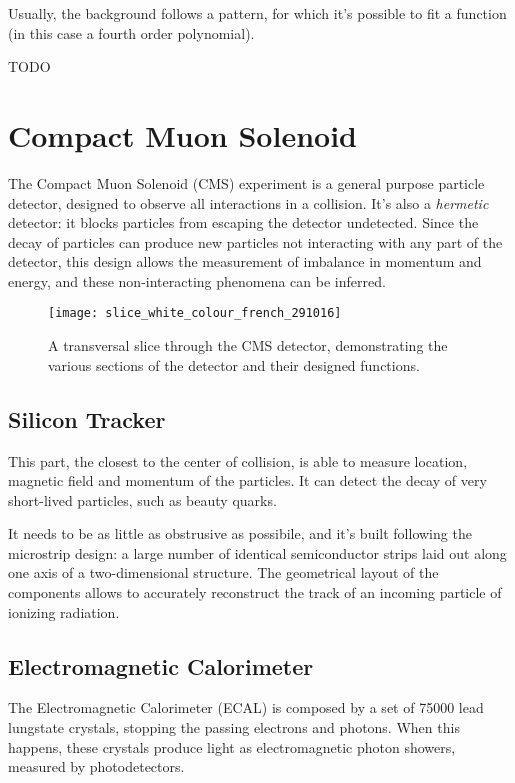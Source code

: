 Usually, the background follows a pattern, for which it's possible to fit a function (in this case a fourth order polynomial).

TODO


\section{Compact Muon Solenoid}

The Compact Muon Solenoid (CMS) experiment is a general purpose particle detector, designed to observe all interactions in a collision. It's also a \textit{hermetic} detector: it blocks particles from escaping the detector undetected. Since the decay of particles can produce new particles not interacting with any part of the detector, this design allows the measurement of imbalance in momentum and energy, and these non-interacting phenomena can be inferred.

\begin{figure}
	\centerline{
		\texttt{[image: slice\_white\_colour\_french\_291016]}}
	\caption{A transversal slice through the CMS detector, demonstrating the various sections of the detector
		and their designed functions. \cite{Barney:2628641}}
	\label{fig:cms2}
\end{figure}

\subsection{Silicon Tracker}

This part, the closest to the center of collision, is able to measure location, magnetic field and momentum of the particles. It can detect the decay of very short-lived particles, such as beauty quarks.

It needs to be as little as obstrusive as possibile, and it's built following the microstrip design: a large number of identical semiconductor strips laid out along one axis of a two-dimensional structure. The geometrical layout of the components allows to accurately reconstruct the track of an incoming particle of ionizing radiation.

\subsection{Electromagnetic Calorimeter}

The Electromagnetic Calorimeter (ECAL) is composed by a set of 75000 lead lungstate crystals, stopping the passing electrons and photons. When this happens, these crystals produce light as electromagnetic photon showers, measured by photodetectors.



